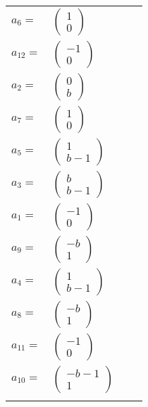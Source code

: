 \documentclass[1p]{elsarticle_modified}
\theoremstyle{definition}
\begin{document}
\begin{tabular}{m{7pt} m{180pt} m{7pt} m{180pt} }
\flushright $a_{6}=$&$\begin{pmatrix}1\\0\end{pmatrix}$ \\
\flushright $a_{12}=$&$\begin{pmatrix}-1\\0\end{pmatrix}$ \\
\flushright $a_{2}=$&$\begin{pmatrix}0\\b\end{pmatrix}$ \\
\flushright $a_{7}=$&$\begin{pmatrix}1\\0\end{pmatrix}$ \\
\flushright $a_{5}=$&$\begin{pmatrix}1\\b-1\end{pmatrix}$ \\
\flushright $a_{3}=$&$\begin{pmatrix}b\\b-1\end{pmatrix}$ \\
\flushright $a_{1}=$&$\begin{pmatrix}-1\\0\end{pmatrix}$ \\
\flushright $a_{9}=$&$\begin{pmatrix}- b\\1\end{pmatrix}$ \\
\flushright $a_{4}=$&$\begin{pmatrix}1\\b-1\end{pmatrix}$ \\
\flushright $a_{8}=$&$\begin{pmatrix}- b\\1\end{pmatrix}$ \\
\flushright $a_{11}=$&$\begin{pmatrix}-1\\0\end{pmatrix}$ \\
\flushright $a_{10}=$&$\begin{pmatrix}- b-1\\1\end{pmatrix}$\\&\end{tabular}
\end{document}
